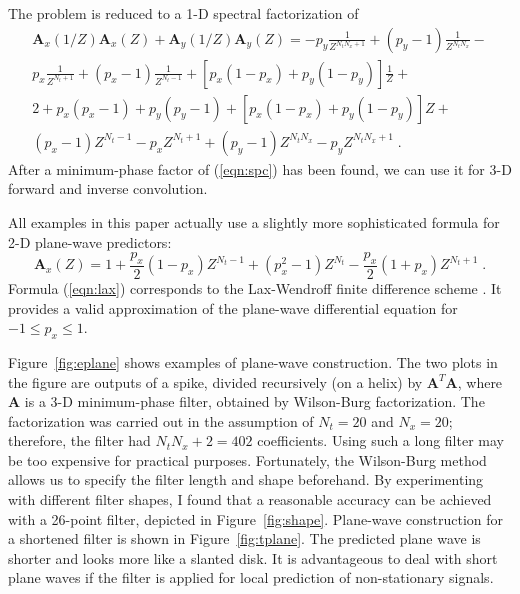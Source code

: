 The problem is reduced to a 1-D spectral factorization of
\begin{eqnarray}
\nonumber 
& \mathbf{A}_x (1/Z) \mathbf{A}_x (Z) + \mathbf{A}_y (1/Z) \mathbf{A}_y (Z) = 
- p_y \frac{1}{Z^{N_t N_x + 1}} + (p_y - 1) \frac{1}{Z^{N_t N_x}} -
& \\
\nonumber 
& p_x \frac{1}{Z^{N_t + 1}} + (p_x - 1) \frac{1}{Z^{N_t-1}}  + 
\left[p_x (1 - p_x) + p_y (1 - p_y)\right] \frac{1}{Z} +
& \\
\nonumber
& 2 + 
p_x (p_x - 1) + p_y (p_y - 1) + 
\left[p_x (1 - p_x) + p_y (1 - p_y)\right] Z + & \\
&  (p_x - 1) Z^{N_t-1}
- p_x Z^{N_t + 1} + (p_y - 1) Z^{N_t N_x}
- p_y Z^{N_t N_x + 1}\;. &
\label{eqn:spc}
\end{eqnarray}
After a minimum-phase factor of (\ref{eqn:spc}) has been found, we can
use it for 3-D forward and inverse convolution.
\par
All examples in this paper actually use a slightly more sophisticated
formula for 2-D plane-wave predictors:
\begin{equation}
\label{eqn:lax}
\mathbf{A}_x (Z) = 1  + \frac{p_x}{2} (1 - p_x) Z^{N_t - 1} + (p_x^2 - 1) Z^{N_t}
- \frac{p_x}{2} (1 + p_x) Z^{N_t + 1}\;.
\end{equation}
Formula (\ref{eqn:lax}) corresponds to the Lax-Wendroff finite
difference scheme \cite[]{Clapp.sep.95.bob1}.  It provides a valid
approximation of the plane-wave differential equation for 
$-1 \le p_x \le 1$.
\par
{}


 
Figure~\ref{fig:eplane} shows examples of plane-wave construction. The
two plots in the figure are outputs of a spike, divided recursively
(on a helix) by $\mathbf{A}^{T} \mathbf{A}$, where $\mathbf{A}$ is a 3-D
minimum-phase filter, obtained by Wilson-Burg factorization. The
factorization was carried out in the assumption of $N_t=20$ and
$N_x=20$; therefore, the filter had $N_t N_x +2 = 402$ coefficients.
Using such a long filter may be too expensive for practical purposes.
Fortunately, the Wilson-Burg method allows us to specify the filter
length and shape beforehand. By experimenting with different filter
shapes, I found that a reasonable accuracy can be achieved with a
26-point filter, depicted in Figure~\ref{fig:shape}. Plane-wave
construction for a shortened filter is shown in
Figure~\ref{fig:tplane}. The predicted plane wave is shorter and looks
more like a slanted disk. It is advantageous to deal with short plane
waves if the filter is applied for local prediction of non-stationary
signals.

